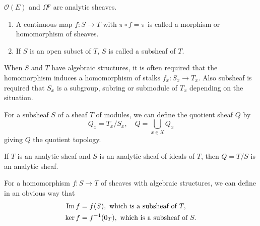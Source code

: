 \documentclass[12pt]{article}
\begin{document}
\begin{example}
  \(\mathcal{O}(E)\) and \(\Omega^p\) are analytic sheaves.
\end{example}

\begin{definition}\hfill
\begin{enumerate}[(1)]
\item A continuous map \(f\colon S\to T\) with \(\pi\circ f=\pi\) is called a
  morphism or homomorphism of sheaves.
\item If \(S\) is an open subset of \(T\), \(S\) is called a subsheaf of \(T\).
\end{enumerate}
When \(S\) and \(T\) have algebraic structures, it is often required that the
homomorphism induces a homomorphism of stalks \(f_x\colon S_x\to T_x\). Also
subsheaf is required that \(S_x\) is a subgroup, subring or submodule of \(T_x\)
depending on the situation.
\end{definition}

\begin{definition}
  For a subsheaf \(S\) of a sheaf \(T\) of modules, we can define the quotient
  sheaf \(Q\) by \[
    Q_x=T_x/S_x,\quad Q=\bigcup_{x\in X}Q_x
  \] giving \(Q\) the quotient topology.
\end{definition}

\begin{example}
  If \(T\) is an analytic sheaf and \(S\) is an analytic sheaf of ideals of \(T\),
  then \(Q=T/S\) is an analytic sheaf.
\end{example}

\begin{definition}
  For a homomorphism \(f\colon S\to T\) of sheaves with algebraic structures,
  we can define in an obvious way that
  \begin{align*}
    \operatorname{Im} f&=f(S),\ \text{which is a subsheaf of }T, \\
    \ker f&=f^{-1}(0_T),\ \text{which is a subsheaf of }S.
  \end{align*}
\end{definition}
\end{document}
